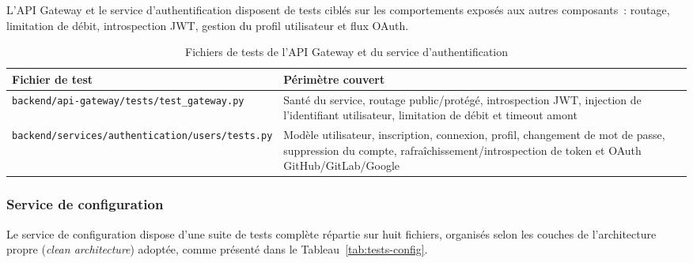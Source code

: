 L'API Gateway et le service d'authentification disposent de tests ciblés sur les comportements
exposés aux autres composants~: routage, limitation de débit, introspection JWT, gestion du
profil utilisateur et flux OAuth.

\begin{table}[H]
\centering
\small
\caption{Fichiers de tests de l'API Gateway et du service d'authentification}
\label{tab:tests-gateway-auth}
\begin{tabular}{|>{\raggedright\arraybackslash}p{5.2cm}
                |>{\raggedright\arraybackslash}p{8cm}|}
\hline
\textbf{Fichier de test} & \textbf{Périmètre couvert} \\
\hline
\texttt{backend/api-gateway/tests/test\_gateway.py} & Santé du service, routage public/protégé, introspection JWT, injection de l'identifiant utilisateur, limitation de débit et timeout amont \\
\hline
\texttt{backend/services/authentication/users/tests.py} & Modèle utilisateur, inscription, connexion, profil, changement de mot de passe, suppression du compte, rafraîchissement/introspection de token et OAuth GitHub/GitLab/Google \\
\hline
\end{tabular}
\end{table}

\subsubsection*{Service de configuration}

Le service de configuration dispose d'une suite de tests complète répartie sur huit fichiers,
organisés selon les couches de l'architecture propre (\textit{clean architecture}) adoptée,
comme présenté dans le Tableau~\ref{tab:tests-config}.

